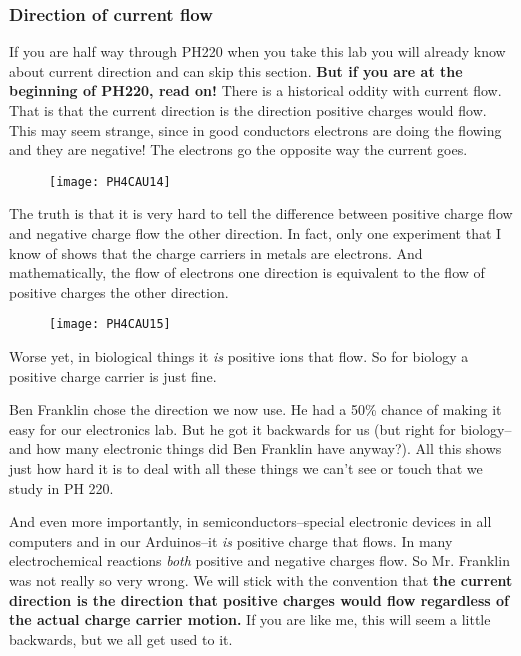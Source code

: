 \subsubsection{Direction of current flow}

If you are half way through PH220 when you take this lab you will already know about current direction and can skip this section. \textbf{But if you are at the beginning of PH220, read on!} There is a historical oddity with current flow. That is that the current direction is the direction positive charges would flow. This may seem strange, since in good conductors electrons are doing the flowing and they are negative! The electrons go the opposite way the current goes. 

\begin{figure}[h!]
	\centering
     \texttt{[image: PH4CAU14]}
\end{figure}

The truth is that it is very hard to tell the difference between positive charge flow and negative charge flow the other direction. In fact, only one experiment that I know of shows that the charge carriers in metals are electrons. And mathematically, the flow of electrons one direction is equivalent to the flow of positive charges the other direction.

\begin{figure}[h!]
     \centering
     \texttt{[image: PH4CAU15]}
\end{figure}

Worse yet, in biological things it \emph{is} positive ions that flow. So for biology a positive charge carrier is just fine.

Ben Franklin chose the direction we now use. He had a 50\% chance of making it easy for our electronics lab. But he got it backwards for us (but right for biology--and how many electronic things did Ben Franklin have anyway?). All this shows just how hard it is to deal with all these things we can't see or touch that we study in PH 220.

And even more importantly, in semiconductors--special electronic devices in all computers and in our Arduinos--it \emph{is} positive charge that flows. In many electrochemical reactions \emph{both} positive and negative charges flow. So Mr. Franklin was not really so very wrong. We will stick with the convention that \textbf{the current direction is the direction that positive charges would flow regardless of the actual charge carrier motion.} If you are like me, this will seem a little backwards, but we all get used to it.

